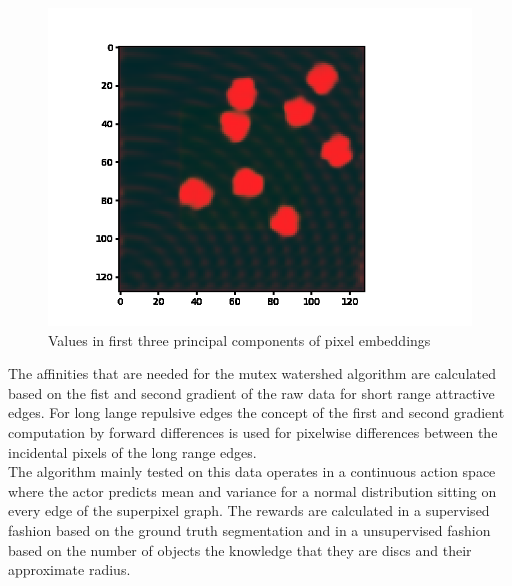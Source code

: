 \begin{figure}[ht!]
	\centering
	\includegraphics[width=.5\textwidth]{figures/plots/pix_embeddings.png}
	\caption{Values in first three principal components of pixel embeddings}
	\label{fig:pixembeddings}
\end{figure}

The affinities that are needed for the mutex watershed algorithm are calculated based on the fist and second gradient of the raw data for short range attractive edges. For long lange repulsive edges the concept of the first and second gradient computation by forward differences is used for pixelwise differences between the incidental pixels of the long range edges.\\
The algorithm mainly tested on this data operates in a continuous action space where the actor predicts mean and variance for a normal distribution sitting on every edge of the superpixel graph. The rewards are calculated in a supervised fashion based on the ground truth segmentation and in a unsupervised fashion based on the number of objects the knowledge that they are discs and their approximate radius.
